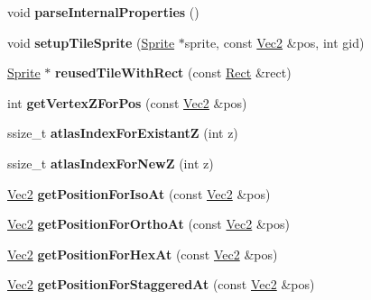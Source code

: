 \begin{DoxyCompactItemize}
\item 
\mbox{\label{classTMXLayer_a971029e08d5cb9d854c68134c81f1c98}} 
void {\bfseries parse\+Internal\+Properties} ()
\item 
\mbox{\label{classTMXLayer_a17911c8c85544920fc1314eba15119cf}} 
void {\bfseries setup\+Tile\+Sprite} (\hyperlink{classSprite}{Sprite} $\ast$sprite, const \hyperlink{classVec2}{Vec2} \&pos, int gid)
\item 
\mbox{\label{classTMXLayer_aa90a9ae17062a32a3f6e3ebac8655363}} 
\hyperlink{classSprite}{Sprite} $\ast$ {\bfseries reused\+Tile\+With\+Rect} (const \hyperlink{classRect}{Rect} \&rect)
\item 
\mbox{\label{classTMXLayer_a43dd1ce85ca7b58d34e6939c9c6d9ca9}} 
int {\bfseries get\+Vertex\+Z\+For\+Pos} (const \hyperlink{classVec2}{Vec2} \&pos)
\item 
\mbox{\label{classTMXLayer_adba8a4560f349073db1a1c185f55add1}} 
ssize\+\_\+t {\bfseries atlas\+Index\+For\+ExistantZ} (int z)
\item 
\mbox{\label{classTMXLayer_a9e6175d0907ed291698fe3f00e0a1618}} 
ssize\+\_\+t {\bfseries atlas\+Index\+For\+NewZ} (int z)
\item 
\mbox{\label{classTMXLayer_a3e04602227f8a60685d38eb54067c228}} 
\hyperlink{classVec2}{Vec2} {\bfseries get\+Position\+For\+Iso\+At} (const \hyperlink{classVec2}{Vec2} \&pos)
\item 
\mbox{\label{classTMXLayer_a0d7d36f39707f0d9dab8632af01cfc96}} 
\hyperlink{classVec2}{Vec2} {\bfseries get\+Position\+For\+Ortho\+At} (const \hyperlink{classVec2}{Vec2} \&pos)
\item 
\mbox{\label{classTMXLayer_ab9b894b913d4fe0dd7c2916131d480f9}} 
\hyperlink{classVec2}{Vec2} {\bfseries get\+Position\+For\+Hex\+At} (const \hyperlink{classVec2}{Vec2} \&pos)
\item 
\mbox{\label{classTMXLayer_a2814e6c370d49fa07362688c63879f4a}} 
\hyperlink{classVec2}{Vec2} {\bfseries get\+Position\+For\+Staggered\+At} (const \hyperlink{classVec2}{Vec2} \&pos)

\end{DoxyCompactItemize}
